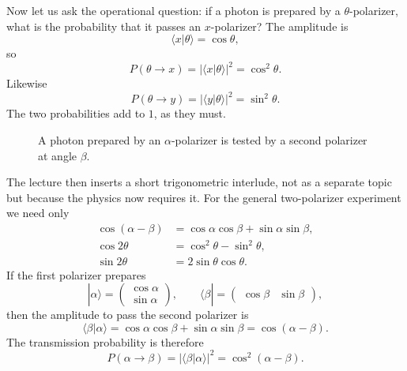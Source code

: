 Now let us ask the operational question: if a photon is prepared by a \(\theta\)-polarizer, what is the probability that it passes an \(x\)-polarizer? The amplitude is
\begin{equation}
\langle x|\theta\rangle=\cos\theta,
\end{equation}
so
\begin{equation}
P(\theta\to x)=|\langle x|\theta\rangle|^2=\cos^2\theta.
\end{equation}
Likewise
\begin{equation}
P(\theta\to y)=|\langle y|\theta\rangle|^2=\sin^2\theta.
\end{equation}
The two probabilities add to \(1\), as they must.

\begin{figure}
\centering
{}
\caption{A photon prepared by an \(\alpha\)-polarizer is tested by a second polarizer at angle \(\beta\).}
\end{figure}

The lecture then inserts a short trigonometric interlude, not as a separate topic but because the physics now requires it. For the general two-polarizer experiment we need only
\begin{align}
\cos(\alpha-\beta)&=\cos\alpha\cos\beta+\sin\alpha\sin\beta,\\
\cos 2\theta&=\cos^2\theta-\sin^2\theta,\\
\sin 2\theta&=2\sin\theta\cos\theta.
\end{align}
If the first polarizer prepares
\begin{equation}
|\alpha\rangle=
\begin{pmatrix}
\cos\alpha\\
\sin\alpha
\end{pmatrix},
\qquad
\langle \beta|=
\begin{pmatrix}
\cos\beta&\sin\beta
\end{pmatrix},
\end{equation}
then the amplitude to pass the second polarizer is
\begin{equation}
\langle\beta|\alpha\rangle
=
\cos\alpha\cos\beta+\sin\alpha\sin\beta
=
\cos(\alpha-\beta).
\end{equation}
The transmission probability is therefore
\begin{equation}
P(\alpha\to\beta)=|\langle\beta|\alpha\rangle|^2=\cos^2(\alpha-\beta).
\end{equation}

